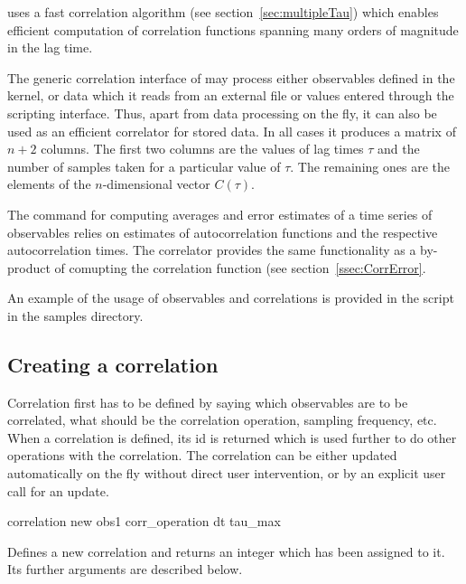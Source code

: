 \es uses a fast correlation algorithm (see section~\ref{sec:multipleTau})
which enables efficient computation of correlation functions spanning
many orders of magnitude in the lag time. 

The generic correlation interface of \es may process either observables
defined in the kernel, or data which it reads from an external file
or values entered through the scripting interface. 
Thus, apart from
data processing on the fly, it can also be used as an efficient correlator
for stored data. In all cases it produces a matrix of 
$n+2$ columns. The first two columns are the values of lag times $\tau$ and 
the number of samples taken for a particular value of $\tau$. The
remaining ones are the elements of the $n$-dimensional vector $C(\tau)$.

The  command for computing averages and error estimates 
of a time series of observables relies on estimates of autocorrelation
functions and the respective autocorrelation times.
The correlator provides the same functionality as a by-product of comupting
the correlation function (see section~\ref{ssec:CorrError}.

An example of the usage of observables and correlations is provided 
in the script  in the samples directory.


\subsection{Creating a correlation}

Correlation first has to be defined by saying which observables 
are to be correlated, what should be the correlation operation, sampling
frequency, etc. When a correlation is defined, its id is returned which is
used further to do other operations with the correlation.
The correlation can be either updated automatically on the fly without
direct user intervention, or by an explicit user call for an update.

\begin{essyntax}
correlation new obs1   corr_operation  dt  tau_max   
\end{essyntax}

Defines a new correlation and returns an integer
 which has been assigned to it. 
Its further arguments are described below.

